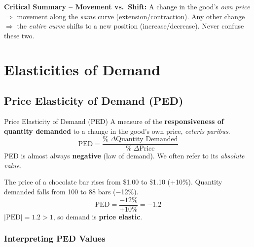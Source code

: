 \documentclass[11pt, a4paper, twoside]{book}
\begin{document}
\begin{tcolorbox}[enhanced,colback=LightGold,colframe=GoldAccent,arc=0pt,boxrule=0.9pt,
  left=8pt,right=8pt,top=6pt,bottom=6pt]
\textbf{\color{NavyPrimary}Critical Summary -- Movement vs.\ Shift:} A change in the good's \emph{own price} $\Rightarrow$ movement along the \emph{same} curve (extension/contraction). Any other change $\Rightarrow$ the \emph{entire curve} shifts to a new position (increase/decrease). Never confuse these two.
\end{tcolorbox}

\section{Elasticities of Demand}



\subsection{Price Elasticity of Demand (PED)}

\begin{keyterm}{Price Elasticity of Demand (PED)}
A measure of the \textbf{responsiveness of quantity demanded} to a change in the good's own price, \emph{ceteris paribus}.
\[
\text{PED} = \frac{\%\;\Delta\text{Quantity Demanded}}{\%\;\Delta\text{Price}}
\]
PED is almost always \textbf{negative} (law of demand). We often refer to its \emph{absolute value}.
\end{keyterm}

\begin{example}
The price of a chocolate bar rises from \$1.00 to \$1.10 (+10\%). Quantity demanded falls from 100 to 88 bars ($-$12\%).
\[
\text{PED} = \frac{-12\%}{+10\%} = -1.2
\]
$|\text{PED}| = 1.2 > 1$, so demand is \textbf{price elastic}.
\end{example}

\subsubsection{Interpreting PED Values}
\end{document}

